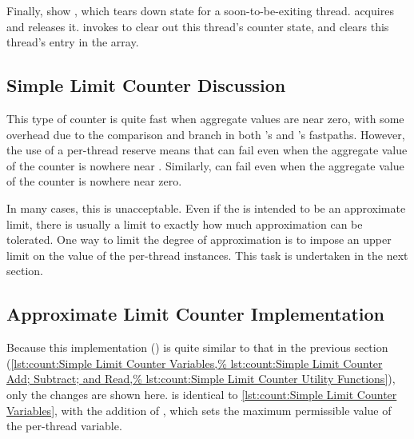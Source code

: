 \begin{fcvref}
Finally,  show ,
which tears down
state for a soon-to-be-exiting thread.
 acquires  and
 releases it.
 invokes 
to clear out this thread's
counter state, and  clears this thread's entry in the
 array.
\end{fcvref}

\subsection{Simple Limit Counter Discussion}
\label{sec:count:Simple Limit Counter Discussion}

This type of counter is quite fast when aggregate values are near zero,
with some overhead due to the comparison and branch in both
's and 's fastpaths.
However, the use of a per-thread  reserve means that
 can fail even when
the aggregate value of the counter is nowhere near .
Similarly,  can fail
even when the aggregate value of the counter is nowhere near zero.

In many cases, this is unacceptable.
Even if the  is intended to be an approximate limit,
there is usually a limit to exactly how much approximation can be tolerated.
One way to limit the degree of approximation is to impose an upper limit
on the value of the per-thread  instances.
This task is undertaken in the next section.

\subsection{Approximate Limit Counter Implementation}
\label{sec:count:Approximate Limit Counter Implementation}

Because this implementation () is quite similar to
that in the previous section
(\cref{lst:count:Simple Limit Counter Variables,%
lst:count:Simple Limit Counter Add; Subtract; and Read,%
lst:count:Simple Limit Counter Utility Functions}),
only the changes are shown here.
is identical to
\cref{lst:count:Simple Limit Counter Variables},
with the addition of , which sets the maximum
permissible value of the per-thread  variable.

